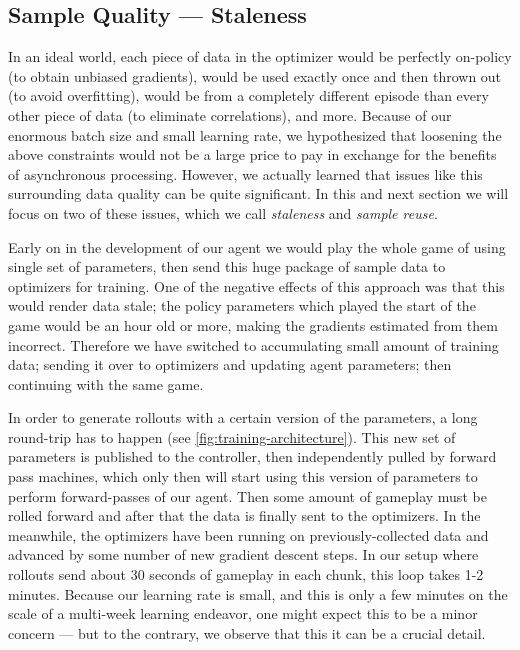 \documentclass[ocean-paper.tex]{subfiles}
\begin{document}
\subsection{Sample Quality --- Staleness}\label{sec:methods:staleness}

In an ideal world, each piece of data in the optimizer would be perfectly on-policy (to obtain unbiased gradients), would be used exactly once and then thrown out (to avoid overfitting), would be from a completely different episode than every other piece of data (to eliminate correlations), and more.
Because of our enormous batch size and small learning rate, we hypothesized that loosening the above constraints would not be a large price to pay in exchange for the benefits of asynchronous processing.
However, we actually learned that issues like this surrounding data quality can be quite significant.
In this and next section we will focus on two of these issues, which we call {\it staleness} and {\it sample reuse}.

Early on in the development of our agent we would play the whole game of \dota using single set of parameters, then send this huge package of sample data to optimizers for training.
One of the negative effects of this approach was that this would render data stale; the policy parameters which played the start of the game would be an hour old or more, making the gradients estimated from them incorrect.
Therefore we have switched to accumulating small amount of training data; sending it over to optimizers and updating agent parameters; then continuing with the same game.

In order to generate rollouts with a certain version of the parameters, a long round-trip has to happen (see \autoref{fig:training-architecture}).
This new set of parameters is published to the controller, then independently pulled by forward pass machines, which only then will start using this version of parameters to perform forward-passes of our agent.
Then some amount of gameplay must be rolled forward and after that the data is finally sent to the optimizers.
In the meanwhile, the optimizers have been running on previously-collected data and advanced by some number of new gradient descent steps.
In our setup where rollouts send about 30 seconds of gameplay in each chunk, this loop takes 1-2 minutes.
Because our learning rate is small, and this is only a few minutes on the scale of a multi-week learning endeavor, one might expect this to be a minor concern --- but to the contrary, we observe that this it can be a crucial detail.
\end{document}
